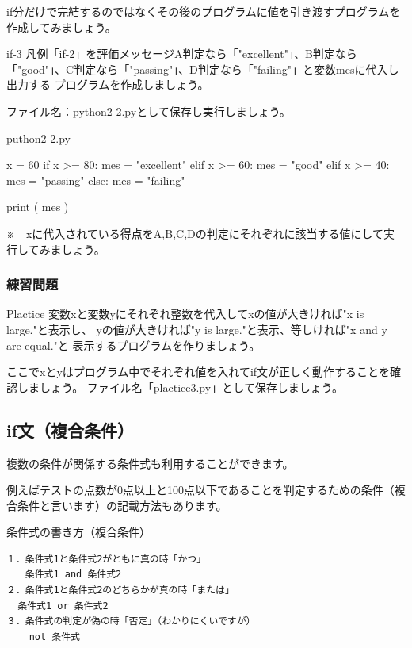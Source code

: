 \documentclass[11pt,a4paper,dvipdfmx,titlepage]{jsreport}
\begin{document}
if分だけで完結するのではなくその後のプログラムに値を引き渡すプログラムを作成してみましょう。
\begin{pabox}{if-3}
凡例「if-2」を評価メッセージA判定なら「"excellent"」、B判定なら「"good"」、C判定なら「"passing"」、D判定なら「"failing"」と変数mesに代入し出力する
プログラムを作成しましょう。

ファイル名：python2-2.pyとして保存し実行しましょう。
\begin{legbox}{puthon2-2.py}
\begin{listing}{1}
x = 60
if x >= 80:
    mes = "excellent"
elif x >= 60:
    mes = "good"
elif x >= 40:
    mes = "passing"
else:
    mes = "failing"

print ( mes )
\end{listing}
\end{legbox}

※　xに代入されている得点をA,B,C,Dの判定にそれぞれに該当する値にして実行してみましょう。
\end{pabox}
\subsubsection{練習問題}
\begin{plabox}{Plactice}
変数xと変数yにそれぞれ整数を代入してxの値が大きければ"x is large."と表示し、
yの値が大きければ"y is large."と表示、等しければ"x and y are equal."と
表示するプログラムを作りましょう。

ここでxとyはプログラム中でそれぞれ値を入れてif文が正しく動作することを確認しましょう。
ファイル名「plactice3.py」として保存しましょう。
\end{plabox}
\subsection{if文（複合条件）}
複数の条件が関係する条件式も利用することができます。

例えばテストの点数が0点以上と100点以下であることを判定するための条件（複合条件と言います）の記載方法もあります。

\begin{grabox}{条件式の書き方（複合条件）}
\begin{verbatim}
１．条件式1と条件式2がともに真の時「かつ」
　　条件式1 and 条件式2
２．条件式1と条件式2のどちらかが真の時「または」
  条件式1 or 条件式2
３．条件式の判定が偽の時「否定」（わかりにくいですが）
    not 条件式
\end{verbatim}

\end{grabox}
\end{document}
